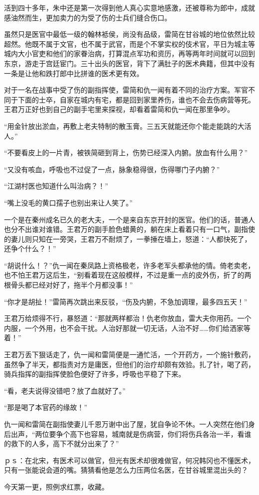 活到四十多年，朱中还是第一次得到他人真心实意地感激，还被尊称为郎中，成就感油然而生，更加卖力的为受了伤的士兵们缝合伤口。

虽然只是医官中最低一级的翰林袛侯，尚没有品级，雷简在甘谷城的地位依然比较超然。他既不属于文官，也不属于武官，而是个不掌实权的伎术官，平日为城主等城内大小官吏和他们的家眷治病，打算混点军功和资历，再等两年时间就可以回到东京，游走于宫廷宦门。三十出头的医官，背下了满肚子的医术典籍，但其中没有一条是让他和跌打郎中比拼谁的医术更有效。

对于一名在战事中受了伤的副指挥使，雷简和仇一闻有着不同的治疗方案。军官不同于下面的士卒，自家在城内有宅，都是回到家里养伤，谁也不会去伤病营等死。王君万正好也到自己的副手宅里来探视，却看着雷简和仇一闻在那里争吵。

“用金针放出淤血，再敷上老夫特制的散玉膏。三五天就能还你个能走能跳的大活人。”

“不要看皮上的一片青，被铁简砸到背上，伤势已经深入内腑。放血有什么用？”

“又没有咳血，呼吸也不过促了一点，脉象稳得很，伤得哪门子内腑？”

“江湖村医也知道什么叫治病？！”

“嘴上没毛的黄口孺子也别出来让人笑了。”

一个是在秦州成名已久的老大夫，一个是来自东京开封的医官。他们的话，普通人也分不出谁对谁错。王君万的副手脸色蜡黄的，躺在床上看着只有一口气，副指使的妻儿则只知在一旁哭，王君万不耐烦了，一拳捶在墙上，怒道：“人都快死了，还争个什么？！”

“胡说什么！？”仇一闻在秦凤路上资格极老，许多老军头都承他的情。倚老卖老，也不怕王君万这后生，“别看着现在这般模样，不过是重一点的皮外伤，折了的两根骨头都已经对好了，拖半个月都没事！”

“你才是胡扯！”雷简再次跳出来反驳，“伤及内腑，不急加调理，最多四五天！”

王君万给烦得不行，暴怒道：“那就两样都治！仇老你放血，雷大夫你用药。一个内服，一个外用，也不会干扰。人治好那就一切无话，人治不好……你们给洒家等着！”

王君万丢下狠话走了，仇一闻和雷简便是一通忙活，一个开药方，一个施针敷药，虽然争了半天，都指责对方是庸医，但他们的治疗却颇有效验。扎了针，喝了药，骑兵指挥的副指挥使脸色便好了许多，呼吸也平稳了下来。

“看，老夫说得没错吧？放了血就好了。”

“那是喝了本官药的缘故！”

仇一闻和雷简在副指使妻儿千恩万谢中出了屋，犹自争论不休。一人突然在他们身后出声，“两位要争个高下也容易，城南就是伤病营，你们将伤兵各治一半，看谁的救下的人多，高下不就分出来了？”

ｐｓ：在北宋，有医术可以做官，但光有医术却很难做官，何况韩冈也不懂医术，只有一张能说会道的嘴。猜猜看他是怎么力压两位名医，在甘谷城里混出头的？

今天第一更，照例求红票，收藏。

